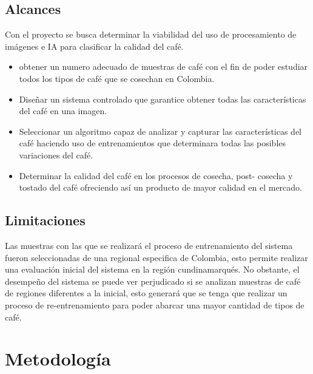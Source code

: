 
\subsection{Alcances}

Con el proyecto se busca determinar la viabilidad del uso de procesamiento de imágenes e IA para clasificar la calidad del café. %

\begin{itemize}

\item obtener un numero adecuado de muestras de café con el fin de poder estudiar todos los tipos de café que se cosechan en Colombia.

\item Diseñar un sistema controlado que garantice obtener todas las características del café en una imagen.

\item	Seleccionar un algoritmo capaz de analizar y capturar las características del café haciendo uso de entrenamientos que determinara todas las posibles variaciones del café.

\item Determinar la calidad del café en los procesos de cosecha, post- cosecha y tostado del café ofreciendo así un producto de mayor calidad en el mercado.


\end{itemize}

\subsection{Limitaciones}

Las muestras con las que se realizará el proceso de entrenamiento del sistema fueron seleccionadas de una regional especifica de Colombia, esto permite realizar una evaluación inicial del sistema en la región cundinamarqués. No obstante, el desempeño del sistema se puede ver perjudicado si se analizan muestras de café de regiones diferentes a la inicial, esto generará que se tenga que realizar un proceso de re-entrenamiento para poder abarcar una mayor cantidad de tipos de café.



\section{Metodología}


